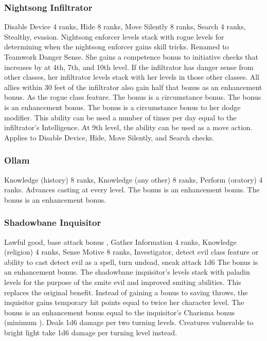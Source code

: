 \subsubsection{Nightsong Infiltrator}
 Disable Device 4 ranks, Hide 8 ranks, Move Silently 8 ranks, Search 4 ranks, Stealthy, evasion.
 Nightsong enforcer levels stack with rogue levels for determining when the nightsong enforcer gains skill tricks.
 Renamed to Teamwork Danger Sense. She gains a  competence bonus to initiative checks that increases by  at 4th, 7th, and 10th level. If the infiltrator has danger sense from other classes, her infiltrator levels stack with her levels in those other classes. All allies within 30 feet of the infiltrator also gain half that bonus as an enhancement bonus.
 As the rogue class feature.
 The bonus is a circumstance bonus.
 The bonus is an enhancement bonus.
 The bonus is a circumstance bonus to her dodge modifier.
 This ability can be used a number of times per day equal to the infiltrator's Intelligence. At 9th level, the ability can be used as a move action.
 Applies to Disable Device, Hide, Move Silently, and Search checks.
\subsubsection{Ollam}
 Knowledge (history) 8 ranks, Knowledge (any other) 8 ranks, Perform (oratory) 4 ranks.
 Advances casting at every level.
 The bonus is an enhancement bonus.
 The bonus is an enhancement bonus.
\subsubsection{Shadowbane Inquisitor}
 Lawful good, base attack bonus , Gather Information 4 ranks, Knowledge (religion) 4 ranks, Sense Motive 8 ranks, Investigator, detect evil class feature or ability to cast detect evil as a spell, turn undead, sneak attack \plus1d6
 The bonus is an enhancement bonus.
 The shadowbane inquisitor's levels stack with paladin levels for the purpose of the smite evil and improved smiting abilities. This replaces the original benefit.
 Instead of gaining a bonus to saving throws, the inquisitor gains temporary hit points equal to twice her character level.
 The bonus is an enhancement bonus equal to the inquisitor's Charisma bonus (minimum ).
 Deals 1d6 damage per two turning levels. Creatures vulnerable to bright light take 1d6 damage per turning level instead.
